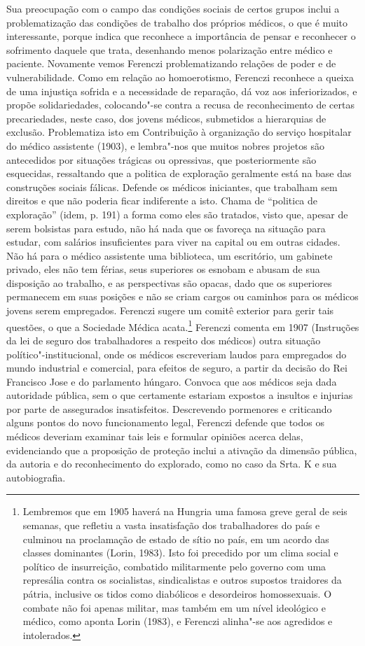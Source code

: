 Sua preocupação com o campo das condições sociais de certos grupos
inclui a problematização das condições de trabalho dos próprios médicos,
o que é muito interessante, porque indica que reconhece a importância de
pensar e reconhecer o sofrimento daquele que trata, desenhando menos
polarização entre médico e paciente. Novamente vemos Ferenczi
problematizando relações de poder e de vulnerabilidade. Como em relação
ao homoerotismo, Ferenczi reconhece a queixa de uma injustiça sofrida e
a necessidade de reparação, dá voz aos inferiorizados, e propõe
solidariedades, colocando"-se contra a recusa de reconhecimento de certas
precariedades, neste caso, dos jovens médicos, submetidos a hierarquias
de exclusão. Problematiza isto em Contribuição à organização do serviço
hospitalar do médico assistente (1903), e lembra"-nos que muitos nobres
projetos são antecedidos por situações trágicas ou opressivas, que
posteriormente são esquecidas, ressaltando que a politica de exploração
geralmente está na base das construções sociais fálicas. Defende os
médicos iniciantes, que trabalham sem direitos e que não poderia ficar
indiferente a isto. Chama de ``politica de exploração'' (idem, p. 191) a
forma como eles são tratados, visto que, apesar de serem bolsistas para
estudo, não há nada que os favoreça na situação para estudar, com
salários insuficientes para viver na capital ou em outras cidades. Não
há para o médico assistente uma biblioteca, um escritório, um gabinete
privado, eles não tem férias, seus superiores os esnobam e abusam de sua
disposição ao trabalho, e as perspectivas são opacas, dado que os
superiores permanecem em suas posições e não se criam cargos ou caminhos
para os médicos jovens serem empregados. Ferenczi sugere um comitê
exterior para gerir tais questões, o que a Sociedade Médica
acata.\footnote{Lembremos que em 1905 haverá na Hungria uma famosa greve
  geral de seis semanas, que refletiu a vasta insatisfação dos
  trabalhadores do país e culminou na proclamação de estado de sítio no
  país, em um acordo das classes dominantes (Lorin, 1983). Isto foi
  precedido por um clima social e político de insurreição, combatido
  militarmente pelo governo com uma represália contra os socialistas,
  sindicalistas e outros supostos traidores da pátria, inclusive os
  tidos como diabólicos e desordeiros homossexuais. O combate não foi
  apenas militar, mas também em um nível ideológico e médico, como
  aponta Lorin (1983), e Ferenczi alinha"-se aos agredidos e intolerados.}
Ferenczi comenta em 1907 (Instruções da lei de seguro dos trabalhadores
a respeito dos médicos) outra situação político"-institucional, onde os
médicos escreveriam laudos para empregados do mundo industrial e
comercial, para efeitos de seguro, a partir da decisão do Rei Francisco
Jose  e do parlamento húngaro. Convoca que aos médicos seja dada
autoridade pública, sem o que certamente estariam expostos a insultos e
injurias por parte de assegurados insatisfeitos. Descrevendo pormenores
e criticando alguns pontos do novo funcionamento legal, Ferenczi defende
que todos os médicos deveriam examinar tais leis e formular opiniões
acerca delas, evidenciando que a proposição de proteção inclui a
ativação da dimensão pública, da autoria e do reconhecimento do
explorado, como no caso da Srta. K e sua autobiografia.

